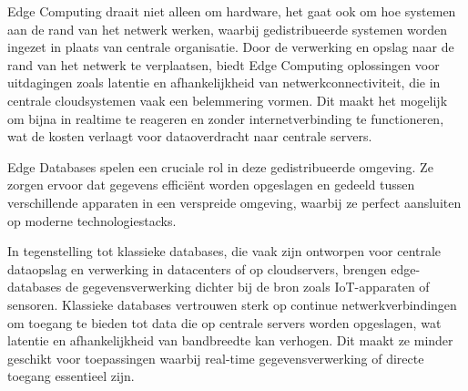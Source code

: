 Edge Computing draait niet alleen om hardware, het gaat ook om hoe systemen aan de rand van het netwerk werken, waarbij gedistribueerde systemen worden ingezet in plaats van centrale organisatie. Door de verwerking en opslag naar de rand van het netwerk te verplaatsen, biedt Edge Computing oplossingen voor uitdagingen zoals latentie en afhankelijkheid van netwerkconnectiviteit, die in centrale cloudsystemen vaak een belemmering vormen. Dit maakt het mogelijk om bijna in realtime te reageren en zonder internetverbinding te functioneren, wat de kosten verlaagt voor dataoverdracht naar centrale servers.

Edge Databases spelen een cruciale rol in deze gedistribueerde omgeving. Ze zorgen ervoor dat gegevens efficiënt worden opgeslagen en gedeeld tussen verschillende apparaten in een verspreide omgeving, waarbij ze perfect aansluiten op moderne technologiestacks.

In tegenstelling tot klassieke databases, die vaak zijn ontworpen voor centrale dataopslag en verwerking in datacenters of op cloudservers, brengen edge-databases de gegevensverwerking dichter bij de bron zoals IoT-apparaten of sensoren.
 Klassieke databases vertrouwen sterk op continue netwerkverbindingen om toegang te bieden tot data die op centrale servers worden opgeslagen, wat latentie en afhankelijkheid van bandbreedte kan verhogen.
Dit maakt ze minder geschikt voor toepassingen waarbij real-time gegevensverwerking of directe toegang essentieel zijn.

